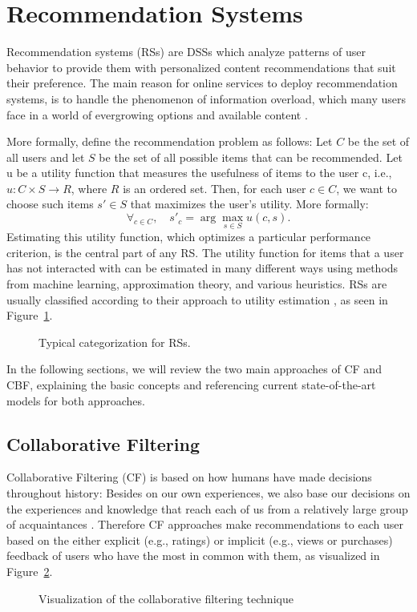 \section{Recommendation Systems}
Recommendation systems (\acp{RS}) are \acp{DSS} which analyze patterns of user behavior to provide them with personalized content recommendations that suit their preference. The main reason for online services to deploy recommendation systems, is to handle the phenomenon of information overload, which many users face in a world of evergrowing options and available content \parencite{bobadilla2013recommender}. 

More formally, \cite{adomavicius2005toward} define the recommendation problem as follows: Let $C$ be the set of all users and let $S$ be the set of all possible items that can be recommended. Let u be a utility function that measures the usefulness of items to the user c, i.e., $u : C \times S \to R$, where $R$ is an ordered set. Then, for each user $c \in C $, we want to choose such items $s' \in S $ that maximizes the user's utility. More formally:
\begin{equation}
\forall_{c \in C}, \quad s'_c = \arg\max_{s \in S} u(c, s).
\end{equation}
Estimating this utility function, which optimizes a particular performance criterion, is the central part of any \ac{RS}. The utility function for items that a user has not interacted with can be estimated in many different ways using methods from machine learning, approximation theory, and various heuristics. \acp{RS} are usually classified according to their approach to utility estimation \parencite{adomavicius2005toward}, as seen in Figure~\ref{fig:recsys}. 
\begin{figure}[H]
	\centering
	\vspace{1em}
	
	\caption{Typical categorization for \acp{RS}.}
	\label{fig:recsys}
\end{figure}
In the following sections, we will review the two main approaches of \ac{CF} and \ac{CBF}, explaining the basic concepts and referencing current state-of-the-art models for both approaches.
\subsection{Collaborative Filtering}
Collaborative Filtering (\acs{CF}) is based on how humans have made decisions throughout history: Besides on our own experiences, we also base our decisions on the experiences and knowledge that reach each of us from a relatively large group of acquaintances \parencite{bobadilla2013recommender}. Therefore \ac{CF} approaches make recommendations to each user based on the either explicit (e.g., ratings) or implicit (e.g., views or purchases) feedback of users who have the most in common with them, as visualized in Figure~\ref{fig:cf}.
\begin{figure}[H]
	\centering
	
	\caption{Visualization of the collaborative filtering technique}
	\label{fig:cf}
\end{figure}

